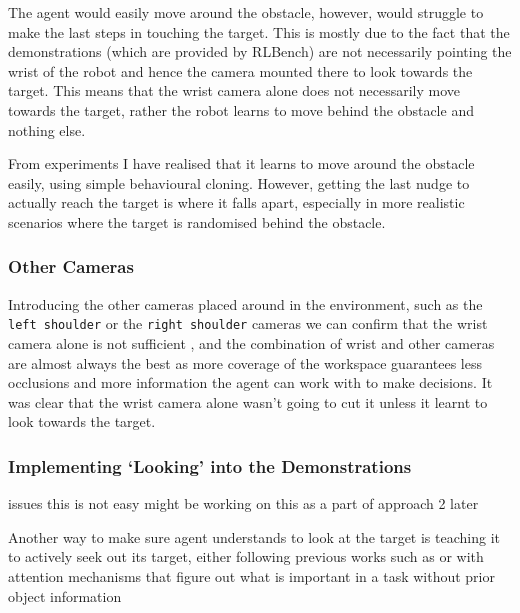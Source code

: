 
The agent would easily move around the obstacle, however, would struggle to make the last steps in touching the target. This is mostly due to the fact that the demonstrations (which are provided by RLBench) are not necessarily pointing the wrist of the robot and hence the camera mounted there to look towards the target. This means that the wrist camera alone does not necessarily move towards the target, rather the robot learns to move behind the obstacle and nothing else.

From experiments I have realised that it learns to move around the obstacle easily, using simple behavioural cloning. However, getting the last nudge to actually reach the target is where it falls apart, especially in more realistic scenarios where the target is randomised behind the obstacle.

\subsubsection{Other Cameras}
Introducing the other cameras placed around in the environment, such as the \verb|left shoulder| or the \verb|right shoulder| cameras we can confirm that the wrist camera alone is not sufficient , and the combination of wrist and other cameras are almost always the best as more coverage of the workspace guarantees less occlusions and more information the agent can work with to make decisions. It was clear that the wrist camera alone wasn't going to cut it unless it learnt to look towards the target.

\subsubsection{Implementing `Looking' into the Demonstrations}\label{ew-looking-at-target}
issues this is not easy might be working on this as a part of approach 2 later

Another way to make sure agent understands to look at the target is teaching it to actively seek out its target, either following previous works such as  or with attention mechanisms that figure out what is important in a task without prior object information 

